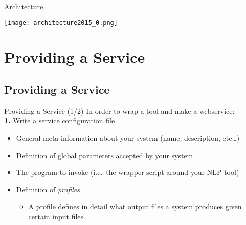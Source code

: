 \documentclass[xcolor=table,10pt,t]{beamer}
\begin{document}
\begin{frame}{Architecture}

    \begin{center}
    \texttt{[image: architecture2015\_0.png]}
    \end{center}

\end{frame}


\section{Providing a Service}

\subsection{Providing a Service}

\begin{frame}
    \begin{block}{Providing a Service (1/2)}
        In order to wrap a tool and make a webservice: \\
        \textbf{1.} Write a service configuration file
        \begin{itemize}
            \item General meta information about your system
                {\footnotesize{(name, description, etc\ldots)}}
            \item Definition of global parameters accepted by your system
            \item The program to invoke {\footnotesize{(i.e.\ the wrapper script around your NLP tool)}}
            \item Definition of \emph{profiles}
            \begin{itemize}
                \item A profile defines in detail what output files a system
                    produces given certain input files.
            \end{itemize}
        \end{itemize}

    \end{block}

\end{frame}
\end{document}

